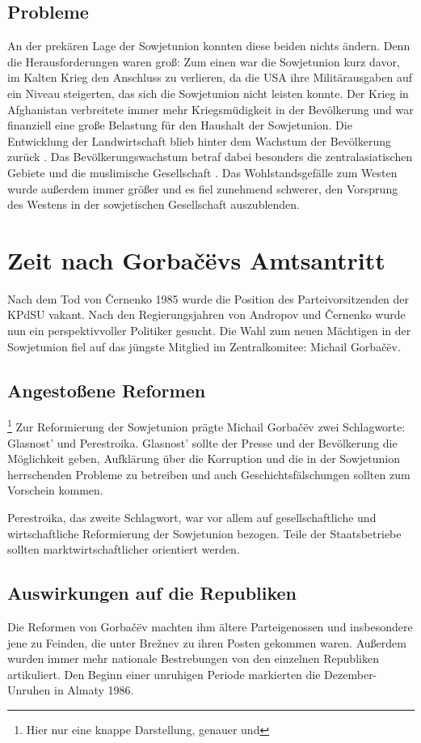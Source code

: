 \documentclass[12pt,headsepline,a4paper]{scrartcl}
\begin{document}
\subsection{Probleme}
An der prekären Lage der Sowjetunion konnten diese beiden nichts ändern. Denn die
Herausforderungen waren groß: Zum einen war die Sowjetunion kurz davor, im Kalten
Krieg den Anschluss zu verlieren, da die USA ihre Militärausgaben auf ein Niveau
steigerten, das sich die Sowjetunion nicht leisten konnte. Der Krieg in Afghanistan
verbreitete immer mehr Kriegsmüdigkeit in der Bevölkerung und war finanziell eine
große Belastung für den Haushalt der Sowjetunion. Die Entwicklung der Landwirtschaft
blieb hinter dem Wachstum der Bevölkerung zurück \autocite[117]{kogel2007}. Das Bevölkerungswachstum
betraf dabei besonders die zentralasiatischen Gebiete und die muslimische
Gesellschaft \autocite[47]{zaslav1991} . Das Wohlstandsgefälle zum Westen wurde außerdem immer größer und
es fiel zunehmend schwerer, den Vorsprung des Westens in der sowjetischen
Gesellschaft auszublenden.

\section{Zeit nach Gorbačëvs Amtsantritt}
Nach dem Tod von Černenko 1985 wurde die Position des Parteivorsitzenden der
KPdSU vakant. Nach den Regierungsjahren von Andropov und Černenko
wurde nun ein perspektivvoller Politiker gesucht. Die Wahl zum neuen Mächtigen in der
Sowjetunion fiel auf das jüngste Mitglied im Zentralkomitee: Michail Gorbačëv.

\subsection{Angestoßene Reformen}\footnote{Hier nur eine knappe Darstellung, genauer  und } 
Zur Reformierung der Sowjetunion prägte Michail Gorbačëv zwei Schlagworte: Glasnost' und
Perestroika. Glasnost' sollte der Presse und der Bevölkerung die Möglichkeit geben, Aufklärung
über die Korruption und die in der Sowjetunion herrschenden Probleme zu betreiben
und auch Geschichtsfälschungen sollten zum Vorschein kommen.

Perestroika, das zweite Schlagwort, war vor allem auf gesellschaftliche und
wirtschaftliche Reformierung der Sowjetunion bezogen. Teile der Staatsbetriebe sollten
marktwirtschaftlicher orientiert werden.

\subsection{Auswirkungen auf die Republiken}
Die Reformen von Gorbačëv machten ihm ältere Parteigenossen und insbesondere
jene zu Feinden, die unter Brežnev zu ihren Posten gekommen waren. Außerdem
wurden immer mehr nationale Bestrebungen von den einzelnen Republiken artikuliert.
Den Beginn einer unruhigen Periode markierten die Dezember-Unruhen in Almaty
1986.
\end{document}
